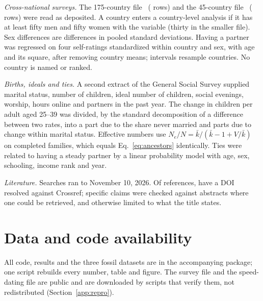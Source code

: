 \emph{Cross-national surveys.} The 175-country file~\cite{kowal2025} (\WdN{} rows) and the 45-country
file~\cite{walter2020} (\WtN{} rows) were read as deposited. A country enters a country-level analysis if it has at least
fifty men and fifty women with the variable (thirty in the smaller file). Sex differences are differences in pooled
standard deviations. Having a partner was regressed on four self-ratings standardized within country and sex, with age and
its square, after removing country means; intervals resample countries. No country is named or ranked.

\emph{Births, ideals and ties.} A second extract of the General Social Survey supplied marital status, number of
children, ideal number of children, social evenings, worship, hours online and partners in the past year. The change in
children per adult aged 25--39 was divided, by the standard decomposition of a difference between two rates, into a part
due to the share never married and parts due to change within marital status. Effective numbers use
$N_e/N=\bar k/(\bar k-1+V/\bar k)$ on completed families, which equals Eq.~\eqref{eq:ancestors} identically. Ties were
related to having a steady partner by a linear probability model with age, sex, schooling, income rank and year.

\emph{Literature.} Searches ran to November 10, 2026. Of \RefCited{} references, \RefResolved{} have a DOI resolved
against Crossref; specific claims were checked against abstracts where one could be retrieved, and otherwise limited to
what the title states.

\section*{Data and code availability}

\noindent All code, results and the three fossil datasets are in the accompanying package; one script rebuilds every number,
table and figure. The survey file and the speed-dating file are public and are downloaded by scripts that verify them, not
redistributed (Section~\ref{app:repro}).
